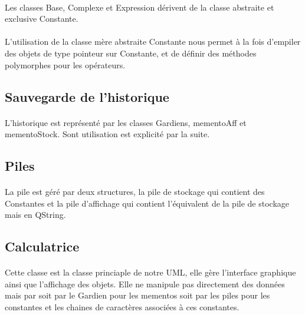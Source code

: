 \documentclass[a4paper,12pt]{report}
\begin{document}
			\paragraph{}Les classes Base, Complexe et Expression dérivent de la classe abstraite et exclusive Constante. 

			\paragraph{}L'utilisation de la classe mère abstraite Constante nous permet à la fois d'empiler des objets de type pointeur sur Constante, et de définir des méthodes polymorphes pour les opérateurs. 

		\subsection{Sauvegarde de l'historique}
	 		\paragraph{}L'historique est représenté par les classes Gardiens, mementoAff et mementoStock. Sont utilisation est explicité par la suite.
		\subsection{Piles}
			\paragraph{} La pile est géré par deux structures, la pile de stockage qui contient des Constantes et la pile d'affichage qui contient l'équivalent de la pile de stockage mais en QString.
		
		\subsection{Calculatrice}
			\paragraph{}Cette classe est la classe princiaple de notre UML, elle gère l'interface graphique ainsi que l'affichage des objets. Elle ne manipule pas directement des données mais par soit par le Gardien pour les mementos soit par les piles pour les constantes et les chaines de caractères associées à ces constantes.
			
\end{document}
